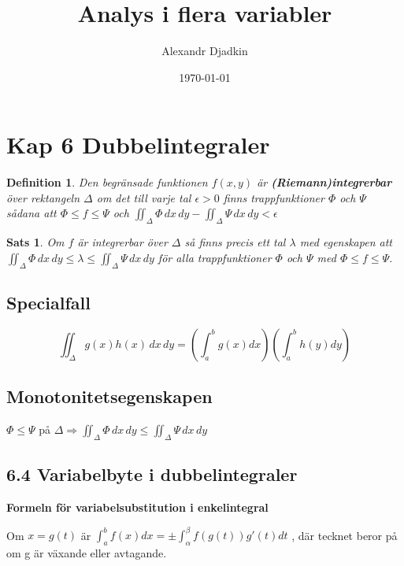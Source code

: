 \documentclass[a4paper]{article}
\title{Analys i flera variabler}
\author{Alexandr Djadkin}
\date{\today}
\newtheorem{thm}{Sats}
\newtheorem{dfn}{Definition}
\begin{document}
\maketitle




\section{Kap 6 Dubbelintegraler}

\begin{dfn}

Den begränsade funktionen $f(x,y)$ är \textbf{(Riemann)integrerbar} över rektangeln $\Delta$ om det till varje tal $\epsilon > 0$ finns trappfunktioner $\Phi$ och $\Psi$ sådana att $\Phi \leq f \leq \Psi$ och $\iint_\Delta \Phi \,dx \,dy - \iint_\Delta \Psi \,dx \,dy < \epsilon$

\end{dfn}


\begin{thm}
Om $f$ är integrerbar över $\Delta$ så finns precis ett tal $\lambda$ med egenskapen att  $\iint_\Delta \Phi\,dx\,dy \leq \lambda \leq \iint_\Delta \Psi\,dx\,dy$  för alla trappfunktioner $\Phi$ och $\Psi$ med $\Phi \leq f \leq \Psi$.

\end{thm}


\subsection{Specialfall}

\begin{equation}
\iint_\Delta g(x)h(x )\,dx \,dy = \left(\int_{a}^{b} g(x) dx\right)\left(\int_{a}^{b} h(y) dy\right)
\end{equation} 

\subsection{Monotonitetsegenskapen}


$\Phi \leq \Psi $ på $ \Delta \Rightarrow \iint_\Delta \Phi \,dx \,dy \leq \iint_\Delta \Psi \,dx \,dy\
$

\subsection{6.4 Variabelbyte i dubbelintegraler}

\textbf{Formeln för variabelsubstitution i enkelintegral}

Om $ x = g(t) $ är $ \int_{a}^{b} f(x) dx = \pm \int_{\alpha}^{\beta} f(g(t))g'(t)dt $
, där tecknet beror på om g är växande eller avtagande.
\end{document}
